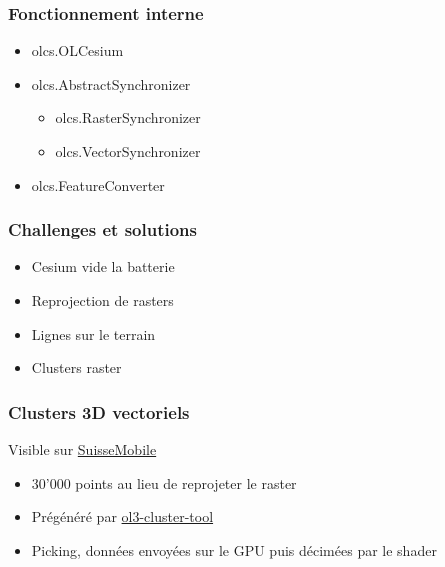 \documentclass[handout]{beamer}
\begin{document}
   \begin{frame}
    \frametitle{Fonctionnement interne}
    \begin{itemize}
      \item olcs.OLCesium
        \pause
      \item olcs.AbstractSynchronizer
        \begin{itemize}
          \item olcs.RasterSynchronizer
          \item olcs.VectorSynchronizer
        \end{itemize}
        \pause
      \item olcs.FeatureConverter
    \end{itemize}
  \end{frame}


  \begin{frame}
    \frametitle{Challenges et solutions}
    \begin{itemize}
      \item Cesium vide la batterie
        \pause
      \item Reprojection de rasters
        \pause
      \item Lignes sur le terrain
        \pause
      \item Clusters raster
     \end{itemize}
  \end{frame}

  \begin{frame}
    \frametitle{Clusters 3D vectoriels}
    Visible sur \href{https://map.schweizmobil.ch/?cesium&trackId=2149217&layers=Train}{SuisseMobile}
    \begin{itemize}
      \item 30'000 points au lieu de reprojeter le raster
      \item Prégénéré par \href{https://github.com/gberaudo/ol3-cluster-tool}{ol3-cluster-tool}
      \item Picking, données envoyées sur le GPU puis décimées par le shader
    \end{itemize}
  \end{frame}
\end{document}
